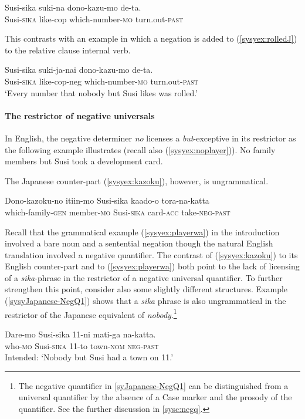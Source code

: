 \documentclass[output=paper,colorlinks,citecolor=brown,
]{langscibook}
\def\refp#1{(\ref{sy#1})}
\def\M#1{\textsc{#1}}
\begin{document}
\ea \label{syex:rolledJ}
\gll *Susi-sika suki-na dono-kazu-mo de-ta.\\
Susi-\M{sika} like-cop which-number-\M{mo} turn.out-\M{past}\\\z

This contrasts with an example in which a negation is added to \refp{syex:rolledJ} to the relative clause internal verb.

\ea \gll Susi-sika suki-ja-nai dono-kazu-mo de-ta.\\
Susi-\M{sika} like-cop-neg which-number-\M{mo} turn.out-\M{past}\\
\glt `Every number that nobody but Susi likes was rolled.'\z

\paragraph{The restrictor of negative universals}   In English, the negative determiner \emph{no} licenses a \emph{but}-exceptive in its restrictor as the following example illustrates (recall also \refp{syex:noplayer}).
\ea{} No family members but Susi took a development card. \z

The  Japanese counter-part \refp{syex:kazoku}, however, is ungrammatical.

\ea \label{syex:kazoku}
\gll *Dono-kazoku-no itiin-mo Susi-sika kaado-o tora-na-katta\\
which-family-\M{gen} member-\M{mo} Susi-\M{sika} card-\M{acc} take-\M{neg-past}\\
\z

Recall that the grammatical example \refp{syex:playerwa} in the introduction involved a bare noun and a sentential negation though the natural English translation involved a negative quantifier. The contrast of \refp{syex:kazoku} to its English counter-part and to \refp{syex:playerwa} both point to the lack of licensing of a \emph{sika}-phrase in the restrictor of a negative universal quantifier.  To further strengthen this point, consider also some slightly different structures.
Example \refp{syJapanese-NegQ1} shows that a \emph{sika} phrase is also ungrammatical in the restrictor of the Japanese equivalent of \emph{nobody}.\footnote{The negative quantifier in \ref{syJapanese-NegQ1} can be distinguished from a universal quantifier by the absence of a Case marker and the prosody of the quantifier. See the further discussion in \ref{sysc:negq}.}

\ea \label{syJapanese-NegQ1}
\gll *Dare-mo Susi-sika 11-ni mati-ga na-katta.\\
who-\M{mo} Susi-\M{sika} 11-to town-\M{nom} \M{neg}-\M{past}\\
\glt Intended: `Nobody but Susi had a town on 11.'\z
\end{document}
